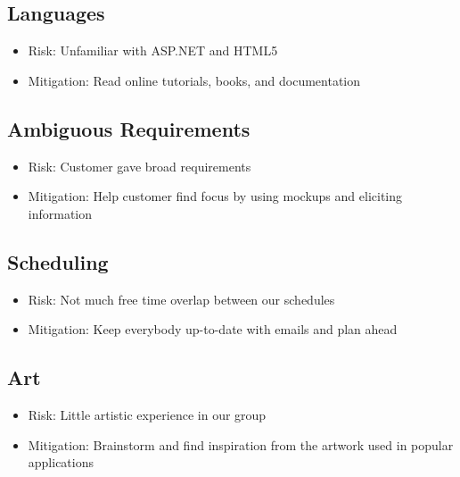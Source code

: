 \documentclass[11pt,a4paper,oneside]{article}
\begin{document}
\subsection{Languages}

\begin{itemize}
\item Risk: Unfamiliar with ASP.NET and HTML5 
\item Mitigation: Read online tutorials, books, and documentation
\end{itemize}


\subsection{Ambiguous Requirements}

\begin{itemize}
\item Risk: Customer gave broad requirements
\item Mitigation: Help customer find focus by using mockups and eliciting information
\end{itemize}


\subsection{Scheduling}

\begin{itemize}
\item Risk: Not much free time overlap between our schedules
\item Mitigation: Keep everybody up-to-date with emails and plan ahead
\end{itemize}


\subsection{Art}

\begin{itemize}
\item Risk: Little artistic experience in our group
\item Mitigation: Brainstorm and find inspiration from the artwork used in popular applications
\end{itemize}
\end{document}
